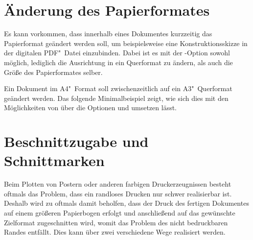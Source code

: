 \section{%
  Änderung des Papierformates%
}
%
Es kann vorkommen, dass innerhalb eines Dokumentes kurzzeitig das Papierformat 
geändert werden soll, um beispielsweise eine Konstruktionsskizze in der 
digitalen PDF"~Datei einzubinden. Dabei ist es mit der \KOMAScript-Option 
 sowohl möglich, lediglich die Ausrichtung in ein 
Querformat zu ändern, als auch die Größe des Papierformates selber.
%
\begin{Example}
Ein Dokument im A4"~Format soll zwischenzeitlich auf ein A3"~Querformat 
geändert werden. Das folgende Minimalbeispiel zeigt, wie sich dies mit den 
Möglichkeiten von \KOMAScript über die Optionen  und 
 umsetzen lässt.
\end{Example}



\section{%
  Beschnittzugabe und Schnittmarken%
  \label{sec:tips:crop}%
}
%
%
Beim Plotten von Postern oder anderen farbigen Druckerzeugnissen besteht 
oftmals das Problem, dass ein randloses Drucken nur schwer realisierbar ist. 
Deshalb wird zu oftmals damit beholfen, dass der Druck des fertigen Dokumentes 
auf einem größeren Papierbogen erfolgt und anschließend auf das gewünschte 
Zielformat zugeschnitten wird, womit das Problem des nicht bedruckbaren Randes 
entfällt. Dies kann über zwei verschiedene Wege realisiert werden.


